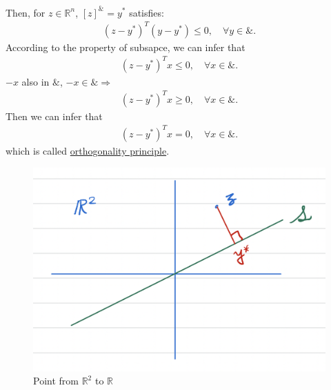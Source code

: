\documentclass[11pt,a4paper]{article}
\begin{document}
Then, for $z\in \mathbb{R}^n$, $[z]^\&=y^*$ satisfies:
\begin{equation}
    \begin{aligned}
        (z-y^*)^T(y-y^*)\leq 0,\quad \forall y\in\&.
    \end{aligned}
    \nonumber
\end{equation}
According to the property of subsapce, we can infer that
\begin{equation}
    \begin{aligned}
        (z-y^*)^Tx\leq 0,\quad \forall x\in\&.
    \end{aligned}
    \nonumber
\end{equation}
$-x$ also in $\&$, $-x\in\& \Rightarrow$
\begin{equation}
    \begin{aligned}
        (z-y^*)^Tx\geq 0,\quad \forall x\in\&.
    \end{aligned}
    \nonumber
\end{equation}
Then we can infer that
\begin{equation}
    \begin{aligned}
        (z-y^*)^Tx= 0,\quad \forall x\in\&.
    \end{aligned}
    \nonumber
\end{equation}
which is called \underline{orthogonality principle}.

\begin{center}\begin{figure}[htbp]
    \centering
    \includegraphics[scale=0.5]{proj1.png}
    \caption{Point from $\mathbb{R}^2$ to $\mathbb{R}$}
    \label{}
\end{figure}\end{center}
\end{document}
